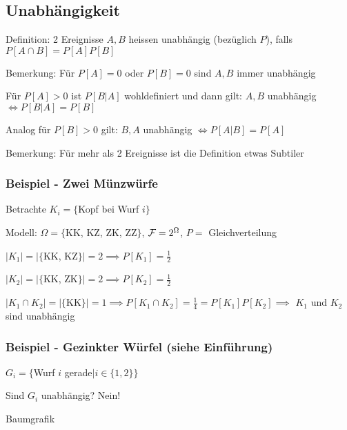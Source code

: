 \subsection{Unabhängigkeit}
\enumstart
	\item Definition: 2 Ereignisse $A,B$ heissen unabhängig (bezüglich $P$), falls $P[A \cap B] = P[A]P[B]$
	\item Bemerkung: Für $P[A] = 0$ oder $P[B] = 0$ sind $A,B$ immer unabhängig
	\item Für $P[A] > 0$ ist $P[B | A]$ wohldefiniert und dann gilt: $A,B$ unabhängig $\Leftrightarrow P[B | A] = P[B]$
	\item Analog für $P[B] > 0$ gilt: $B,A$ unabhängig $\Leftrightarrow P[A | B] = P[A]$
	\item Bemerkung:  Für mehr als 2 Ereignisse ist die Definition etwas Subtiler
\enumend

\subsubsection{Beispiel - Zwei Münzwürfe}
\enumstart
	\item Betrachte $K_i = \{$Kopf bei Wurf $i\}$
	\item Modell: $\Omega = \{$KK, KZ, ZK, ZZ$\}$, $\mathcal{F} = 2^\Omega$, $P =$ Gleichverteilung
	\item $|K_1| = |\{$KK, KZ$\}| = 2 \implies P[K_1] = \frac{1}{2}$
	\item $|K_2| = |\{$KK, ZK$\}| = 2 \implies P[K_2] = \frac{1}{2}$
	\item $|K_1 \cap K_2| = |\{$KK$\}| = 1 \implies P[K_1 \cap K_2] = \frac{1}{4} = P[K_1]P[K_2] \implies$ $K_1$ und $K_2$ sind unabhängig
\enumend

\subsubsection{Beispiel - Gezinkter Würfel (siehe Einführung)}
\enumstart
	\item $G_i = \{$Wurf $i$ gerade$ | i \in \{1,2\}\}$
	\item Sind $G_i$ unabhängig? Nein!
	\item Baumgrafik
\enumend
